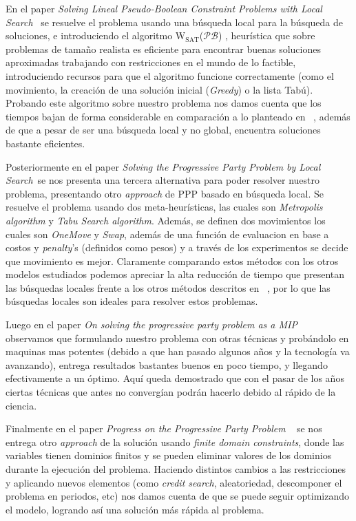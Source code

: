 \documentclass[letter, 10pt]{article}
\begin{document}
En el paper \textit{Solving Lineal Pseudo-Boolean Constraint Problems with Local Search}~\cite{Walser:1997:SLP:1867406.1867448} se resuelve el problema usando una búsqueda local para la búsqueda de soluciones, e introduciendo el algoritmo $\text{W}_{\text{SAT}}$($\mathcal{PB}$) , heurística que sobre problemas de tamaño realista es eficiente para encontrar buenas soluciones aproximadas trabajando con restricciones en el mundo de lo factible, introduciendo recursos para que el algoritmo funcione correctamente (como el movimiento, la creación de una solución inicial (\textit{Greedy}) o la lista Tabú). Probando este algoritmo sobre nuestro problema nos damos cuenta que los tiempos bajan de forma considerable en comparación a lo planteado en ~\cite{Smith1996}, además de que a pesar de ser una búsqueda local y no global, encuentra soluciones bastante eficientes. 

Posteriormente en el paper \textit{Solving the Progressive Party Problem by Local Search}~\cite{Galinier1999}se nos presenta una tercera alternativa para poder resolver nuestro problema, presentando otro \textit{approach} de PPP basado en búsqueda local. Se resuelve el problema usando dos meta-heurísticas, las cuales son \textit{Metropolis algorithm} y \textit{Tabu Search algorithm}. Además, se definen dos movimientos los cuales son \textit{OneMove} y \textit{Swap}, además de una función de evaluacion en base a costos y \textit{penalty}'s (definidos como pesos) y a través de los experimentos se decide que movimiento es mejor. Claramente comparando estos métodos con los otros modelos estudiados podemos apreciar la alta reducción de tiempo que presentan las búsquedas locales frente a los otros métodos descritos en ~\cite{Smith1996}, por lo que las búsquedas locales son ideales para resolver estos problemas.

Luego en el paper \textit{On solving the progressive party problem as a MIP}~\cite{Kalvelagen20031713} observamos que formulando nuestro problema con otras técnicas y probándolo en maquinas mas potentes (debido a que han pasado algunos años y la tecnología va avanzando), entrega resultados bastantes buenos en poco tiempo, y llegando efectivamente a un óptimo. Aquí queda demostrado que con el pasar de los años ciertas técnicas que antes no convergían podrán hacerlo debido al rápido de la ciencia.

Finalmente en el paper \textit{Progress on the Progressive Party Problem} ~\cite{Simonis2009} se nos entrega otro \textit{approach} de la solución usando \textit{finite domain constraints}, donde las variables tienen dominios finitos y se pueden eliminar valores de los dominios durante la ejecución del problema. Haciendo distintos cambios a las restricciones  y aplicando nuevos elementos (como \textit{credit search}, aleatoriedad, descomponer el problema en periodos, etc) nos damos cuenta de que se puede seguir optimizando el modelo, logrando así una solución más rápida al problema.
\end{document}
